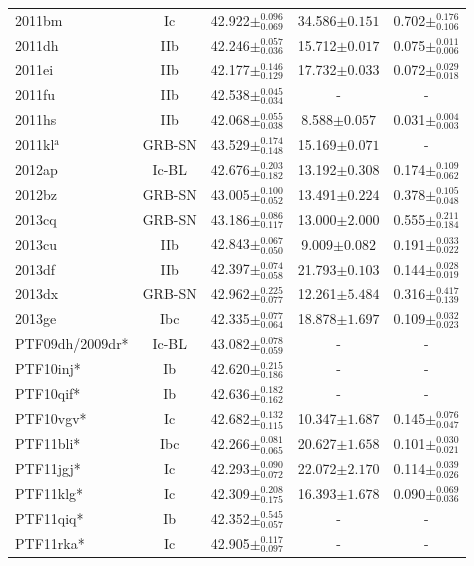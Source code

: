 \documentclass[a4paper,fleqn,usenatbib]{mnras}
\begin{document}
\begin{table}
\begin{minipage}{110mm}
\begin{tabular}{lcccc}
2011bm & Ic & 42.922$\pm^{0.096}_{0.069}$ &34.586$\pm{0.151}$ &0.702$\pm^{0.176}_{0.106}$ \\
2011dh & IIb & 42.246$\pm^{0.057}_{0.036}$ &15.712$\pm{0.017}$ &0.075$\pm^{0.011}_{0.006}$ \\
2011ei & IIb & 42.177$\pm^{0.146}_{0.129}$ &17.732$\pm{0.033}$ &0.072$\pm^{0.029}_{0.018}$ \\
2011fu & IIb & 42.538$\pm^{0.045}_{0.034}$ &- &- \\
2011hs & IIb & 42.068$\pm^{0.055}_{0.038}$ &8.588$\pm{0.057}$ &0.031$\pm^{0.004}_{0.003}$ \\
2011kl$^{\mathrm{a}}$ & GRB-SN & 43.529$\pm^{0.174}_{0.148}$ &15.169$\pm{0.071}$ &- \\
2012ap & Ic-BL & 42.676$\pm^{0.203}_{0.182}$ &13.192$\pm{0.308}$ &0.174$\pm^{0.109}_{0.062}$ \\
2012bz & GRB-SN & 43.005$\pm^{0.100}_{0.052}$ &13.491$\pm{0.224}$ &0.378$\pm^{0.105}_{0.048}$ \\
2013cq & GRB-SN & 43.186$\pm^{0.086}_{0.117}$ &13.000$\pm{2.000}$ &0.555$\pm^{0.211}_{0.184}$ \\
2013cu & IIb & 42.843$\pm^{0.067}_{0.050}$ &9.009$\pm{0.082}$ &0.191$\pm^{0.033}_{0.022}$ \\
2013df & IIb & 42.397$\pm^{0.074}_{0.058}$ &21.793$\pm{0.103}$ &0.144$\pm^{0.028}_{0.019}$ \\
2013dx & GRB-SN & 42.962$\pm^{0.225}_{0.077}$ &12.261$\pm{5.484}$ &0.316$\pm^{0.417}_{0.139}$ \\
2013ge & Ibc & 42.335$\pm^{0.077}_{0.064}$ &18.878$\pm{1.697}$ &0.109$\pm^{0.032}_{0.023}$ \\
PTF09dh/2009dr* & Ic-BL & 43.082$\pm^{0.078}_{0.059}$&-&-\\
PTF10inj* & Ib & 42.620$\pm^{0.215}_{0.186}$ &- &- \\
PTF10qif* & Ib & 42.636$\pm^{0.182}_{0.162}$ &- &- \\
PTF10vgv* & Ic & 42.682$\pm^{0.132}_{0.115}$ &10.347$\pm{1.687}$ &0.145$\pm^{0.076}_{0.047}$ \\
PTF11bli* & Ibc & 42.266$\pm^{0.081}_{0.065}$ &20.627$\pm{1.658}$ &0.101$\pm^{0.030}_{0.021}$ \\
PTF11jgj* & Ic & 42.293$\pm^{0.090}_{0.072}$ &22.072$\pm{2.170}$ &0.114$\pm^{0.039}_{0.026}$ \\
PTF11klg* & Ic & 42.309$\pm^{0.208}_{0.175}$ &16.393$\pm{1.678}$ &0.090$\pm^{0.069}_{0.036}$ \\
PTF11qiq* & Ib & 42.352$\pm^{0.545}_{0.057}$ &- &- \\
PTF11rka* & Ic & 42.905$\pm^{0.117}_{0.097}$ &- &- \\
\hline
\end{tabular}
\end{minipage}
\end{table}
\end{document}
